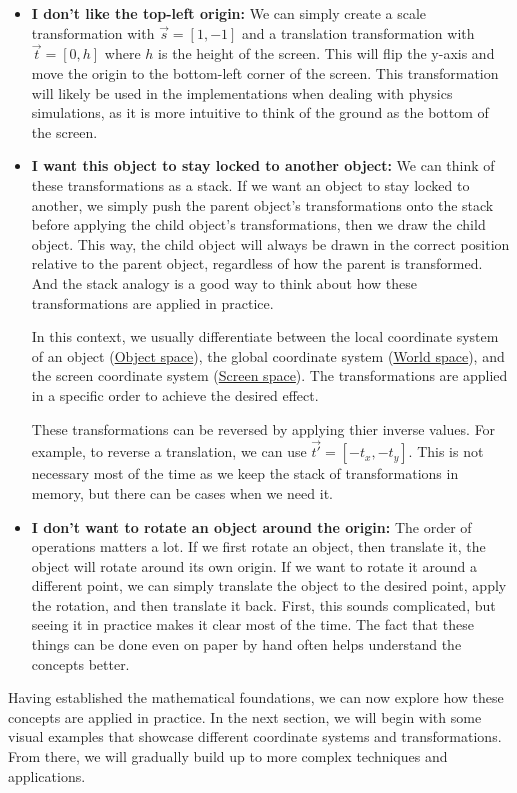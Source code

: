 \begin{itemize}
    \item \textbf{I don't like the top-left origin: } We can simply create a scale transformation with \(\vec{s} = [1, -1]\) and a translation transformation with \(\vec{t} = [0, h]\) where \(h\) is the height of the screen. This will flip the y-axis and move the origin to the bottom-left corner of the screen. This transformation will likely be used in the implementations when dealing with physics simulations, as it is more intuitive to think of the ground as the bottom of the screen.

    \item \textbf{I want this object to stay locked to another object: } We can think of these transformations as a stack. If we want an object to stay locked to another, we simply push the parent object's transformations onto the stack before applying the child object's transformations, then we draw the child object. This way, the child object will always be drawn in the correct position relative to the parent object, regardless of how the parent is transformed. And the stack analogy is a good way to think about how these transformations are applied in practice. 

    \label{sec:spaces}
    \begin{Note} In this context, we usually differentiate between the local coordinate system of an object (\underline{Object space}), the global coordinate system (\underline{World space}), and the screen coordinate system (\underline{Screen space}). The transformations are applied in a specific order to achieve the desired effect.
    \end{Note}

    \begin{Note} These transformations can be reversed by applying thier inverse values. For example, to reverse a translation, we can use \(\vec{t'} = [-t_x, -t_y]\). This is not necessary most of the time as we keep the stack of transformations in memory, but there can be cases when we need it.
    \end{Note}

    \item \textbf{I don't want to rotate an object around the origin: } The order of operations matters a lot. If we first rotate an object, then translate it, the object will rotate around its own origin. If we want to rotate it around a different point, we can simply translate the object to the desired point, apply the rotation, and then translate it back. First, this sounds complicated, but seeing it in practice makes it clear most of the time. The fact that these things can be done even on paper by hand often helps understand the concepts better.
\end{itemize}

\pagebreak

Having established the mathematical foundations, we can now explore how these concepts are applied in practice. In the next section, we will begin with some visual examples that showcase different coordinate systems and transformations. From there, we will gradually build up to more complex techniques and applications.
